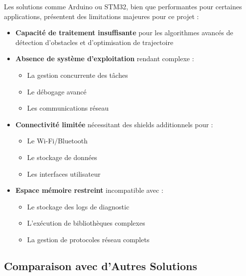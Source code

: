 \documentclass[a4paper, 12pt]{article}
\begin{document}
	Les solutions comme Arduino ou STM32, bien que performantes pour certaines applications, présentent des limitations majeures pour ce projet :
	
	\begin{itemize}
		\item \textbf{Capacité de traitement insuffisante} pour les algorithmes avancés de détection d'obstacles et d'optimisation de trajectoire
		
		\item \textbf{Absence de système d'exploitation} rendant complexe :
		\begin{itemize}
			\item La gestion concurrente des tâches
			\item Le débogage avancé
			\item Les communications réseau
		\end{itemize}
		
		\item \textbf{Connectivité limitée} nécessitant des shields additionnels pour :
		\begin{itemize}
			\item Le Wi-Fi/Bluetooth
			\item Le stockage de données
			\item Les interfaces utilisateur
		\end{itemize}
		
		\item \textbf{Espace mémoire restreint} incompatible avec :
		\begin{itemize}
			\item Le stockage des logs de diagnostic
			\item L'exécution de bibliothèques complexes
			\item La gestion de protocoles réseau complets
		\end{itemize}
	\end{itemize}
	
	\subsection{Comparaison avec d'Autres Solutions}
	
\end{document}
